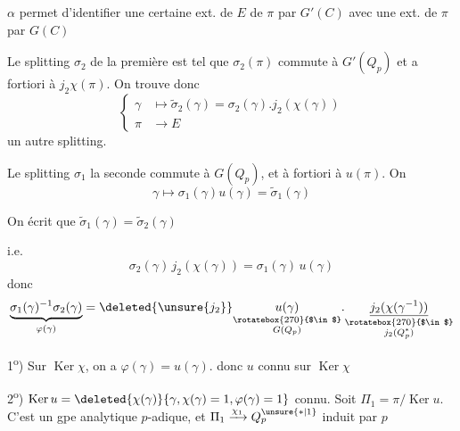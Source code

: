 
\deleted{\unsure{$\alpha$}} $\alpha$ permet d'identifier une certaine ext. de $E$ de $\pi$ par $G'(C)$ avec une  ext. de $\pi$ par $G(C)$

Le splitting $\sigma_2$ de la première est tel que $\sigma_2(\pi)$ commute à $G'(Q_p)$ et a fortiori à $j_2\chi(\pi)$. On trouve donc
\[
\left\{\begin{aligned}
\gamma&\longmapsto\widetilde{\sigma}_2(\gamma)=\sigma_2(\gamma).j_2(\chi(\gamma))\\
\pi&\longrightarrow E
\end{aligned}\right.
\]
un autre splitting.

Le splitting $\sigma_1$  la seconde commute à $G(Q_p)$, et à fortiori à $u(\pi)$. On 
\[
\gamma\longmapsto\sigma_1(\gamma)u(\gamma)=\widetilde{\sigma}_1(\gamma)
\]

On écrit que $\widetilde{\sigma}_1(\gamma)=\widetilde{\sigma}_2(\gamma)$

i.e.
\[
\sigma_2(\gamma)\,j_2(\chi(\gamma))=\sigma_1(\gamma)\,u(\gamma)
\]
donc
\[
\underbrace{\sigma_1(\gamma)^{-1}\sigma_2(\gamma)}_{\varphi(\gamma)}
=\deleted{\unsure{j_2}}\underset{\substack{\rotatebox{270}{$\in$}\\G(Q_p)}}{u(\gamma)}\mathord{.}
\underset{\substack{\rotatebox{270}{$\in$}\\j_2(Q_p^*)}}{\underline{j_2(\chi(\gamma^{-1}))}}
\]

1\textsuperscript{o}) Sur $\operatorname{Ker}\chi$, on a $\varphi(\gamma)=u(\gamma)$. donc $u$ connu sur $\operatorname{Ker}\chi$

2\textsuperscript{o}) $\operatorname{Ker}u=\deleted{\chi(\gamma)}\{\gamma,\chi(\gamma)=1,\varphi(\gamma)=1\}$ connu. Soit $\Pi_1=\pi/\operatorname{Ker}u$. C'est un gpe analytique $p$-adique, et $\Pi_1\xrightarrow{\chi_1}Q_p^{\unsure{*|1}}$ induit par $p$
